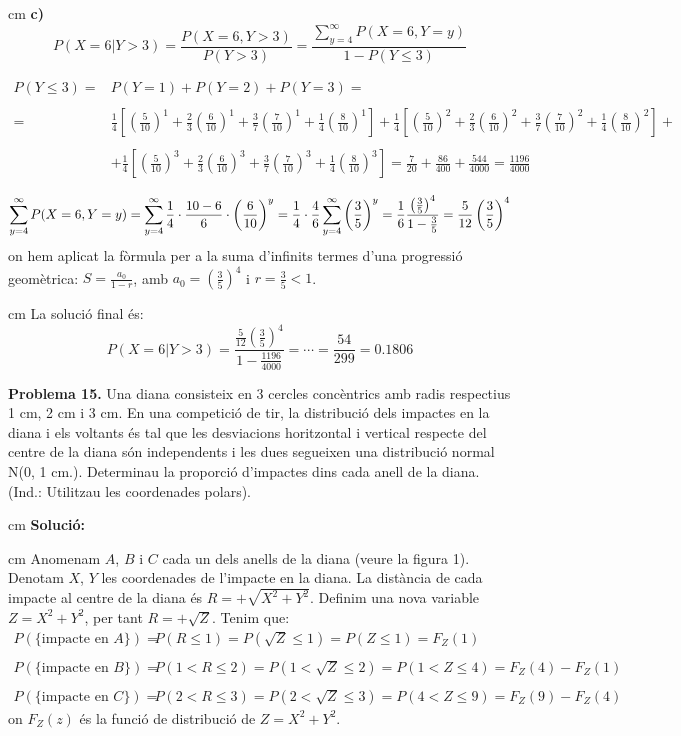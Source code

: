\documentclass{article}
\begin{document}
 cm
\noindent
\textbf{c)}
\[
P(X=6 | Y > 3) = \frac{P(X=6, Y > 3)}{P(Y > 3)}=\frac{\sum_{y=4}^\infty P(X=6, Y=y)}{1-P(Y \leq 3)}
\]

\[
\begin{array}{rl}
P(Y \leq 3)= & P(Y=1)+P(Y=2)+P(Y=3)=  \\ \\
=& \frac{1}{4} \left[ (\frac{5}{10})^1 +\frac{2}{3}(\frac{6}{10})^1 + \frac{3}{7} (\frac{7}{10})^1 +\frac{1}{4}(\frac{8}{10})^1 \right]+
 \frac{1}{4} \left[ (\frac{5}{10})^2 +\frac{2}{3}(\frac{6}{10})^2 + \frac{3}{7} (\frac{7}{10})^2 +\frac{1}{4}(\frac{8}{10})^2 \right] +
\\ \\
& + \frac{1}{4} \left[ (\frac{5}{10})^3 +\frac{2}{3}(\frac{6}{10})^3 + \frac{3}{7} (\frac{7}{10})^3 +\frac{1}{4}(\frac{8}{10})^3 \right] 
= \frac{7}{20} + \frac{86}{400} + \frac{544}{4000} = \frac{1196}{4000}
\end{array} 
\]

\[
\sum_{y=4}^\infty P(X=6, Y=y)= \sum_{y=4}^\infty {1 \over 4} \cdot {10-6 \over 6} \cdot \left ( {6 \over 10} \right )^y=
\frac{1}{4} \cdot \frac{4}{6}  \sum_{y=4}^\infty \left( \frac{3}{5} \right)^y = 
\frac{1}{6} \frac{ \left( \frac{3}{5} \right) ^4}{1-\frac{3}{5}} = \frac{5}{12} \left( \frac{3}{5} \right) ^4
\]
\noindent
on hem aplicat la f\`ormula per a la suma d'infinits termes d'una progressi\'o geom\`etrica: $S=\frac{a_0}{1-r}$, 
amb $a_0=(\frac{3}{5})^4$ i $r=\frac{3}{5} < 1$.

 cm
\noindent
La soluci\'o final \'es:
\[
P(X=6 | Y > 3) = \frac{ \frac{5}{12} \left( \frac{3}{5} \right) ^4 }{ 1- \frac{1196}{4000} } = \cdots = \frac{54}{299}=0.1806
\]

\newpage
\noindent
\textbf{Problema 15.} Una diana consisteix en 3 cercles conc\`entrics amb radis
respectius 1 cm, 2 cm i 3 cm. En una competici\'o de tir, la
distribuci\'o dels impactes en la diana i els voltants \'es tal que
les desviacions horitzontal i vertical respecte del centre de la
diana s\'on independents i les dues segueixen una distribuci\'o normal
N(0, 1 cm.). Determinau la proporci\'o d'impactes dins cada anell de
la diana. (Ind.: Utilitzau les coordenades polars).

 cm
\noindent
\textbf{Soluci\'o:} 

 cm
\noindent
Anomenam $A$, $B$ i $C$ cada un dels anells de la diana (veure la figura 1). 
Denotam $X$, $Y$ les coordenades de l'impacte en la diana. La dist\`ancia de
cada impacte al centre de la diana \'es $R=+\sqrt{X^2+Y^2}$. Definim una
nova variable $Z=X^2+Y^2$, per tant $R=+\sqrt{Z}$.
Tenim que:
\[
\begin{array}{rl}
P(\{\text{impacte en $A$}\})=&P(R \leq 1)=P(\sqrt{Z} \leq 1)=P(Z \leq 1)=F_Z(1) \\ \\
P(\{\text{impacte en $B$}\})=&P(1 < R \leq 2)=P(1 < \sqrt{Z} \leq 2)=P(1 < Z \leq 4)=F_Z(4)-F_Z(1)\\ \\
P(\{\text{impacte en $C$}\})=&P(2 < R \leq 3)=P(2 < \sqrt{Z} \leq 3)=P(4 < Z \leq 9)=F_Z(9)-F_Z(4)
\end{array}
\]
\noindent
on $F_Z(z)$ \'es la funci\'o de distribuci\'o de $Z=X^2+Y^2$.
\end{document}
